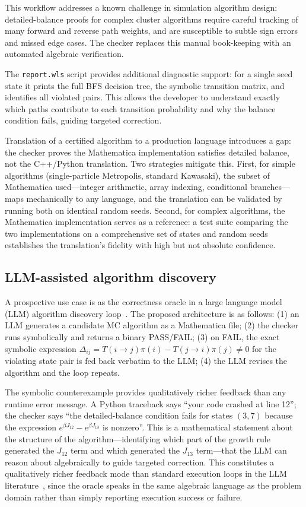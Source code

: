 \documentclass[twocolumn,10pt]{article}
\begin{document}
This workflow addresses a known challenge in simulation algorithm design:
detailed-balance proofs for complex cluster algorithms require careful
tracking of many forward and reverse path weights, and are susceptible to
subtle sign errors and missed edge cases.  The checker replaces this manual
book-keeping with an automated algebraic verification.

The \texttt{report.wls} script provides additional diagnostic support: for a
single seed state it prints the full BFS decision tree, the symbolic
transition matrix, and identifies all violated pairs.  This allows the
developer to understand exactly which paths contribute to each transition
probability and why the balance condition fails, guiding targeted correction.

Translation of a certified algorithm to a production language introduces a
gap: the checker proves the Mathematica implementation satisfies detailed
balance, not the C++/Python translation.  Two strategies mitigate this.
First, for simple algorithms (single-particle Metropolis, standard Kawasaki),
the subset of Mathematica used---integer arithmetic, array indexing,
conditional branches---maps mechanically to any language, and the translation
can be validated by running both on identical random seeds.  Second, for
complex algorithms, the Mathematica implementation serves as a reference: a
test suite comparing the two implementations on a comprehensive set of states
and random seeds establishes the translation's fidelity with high but not
absolute confidence.

\subsection{LLM-assisted algorithm discovery}
\label{sec:uc-llm}

A prospective use case is as the correctness oracle in a large language model
(LLM) algorithm discovery loop~\cite{FunSearch2023,AlphaEvolve2025}.  The
proposed architecture is as follows:
(1) an LLM generates a candidate MC algorithm as a Mathematica file;
(2) the checker runs symbolically and returns a binary PASS/FAIL;
(3) on FAIL, the exact symbolic expression $\Delta_{ij} = T(i\to j)\pi(i) -
T(j\to i)\pi(j)\neq 0$ for the violating state pair is fed back verbatim to
the LLM;
(4) the LLM revises the algorithm and the loop repeats.

The symbolic counterexample provides qualitatively richer feedback than
any runtime error message.  A Python traceback says ``your code crashed at
line 12''; the checker says ``the detailed-balance condition fails for states
$(3,7)$ because the expression $e^{\beta J_{12}} - e^{\beta J_{13}}$ is
nonzero''.  This is a mathematical statement about the structure of the
algorithm---identifying which part of the growth rule generated the $J_{12}$
term and which generated the $J_{13}$ term---that the LLM can reason about
algebraically to guide targeted correction.  This constitutes a qualitatively
richer feedback mode than standard execution loops in the LLM
literature~\cite{PAL2023,ReAct2023,Reflexion2023,LLMLOOP2025}, since the
oracle speaks in the same algebraic language as the problem domain rather
than simply reporting execution success or failure.
\end{document}
